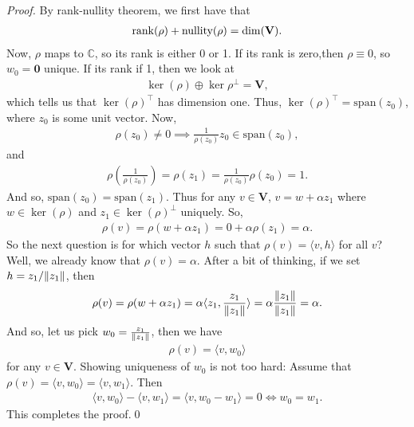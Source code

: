 \documentclass{book}
\theoremstyle{definition}
\newcommand{\C}{\mathbb{C}}
\newcommand{\V}{\mathbf{V}}
\newcommand{\xpan}{\text{span}}
\newcommand{\la}{\langle}
\newcommand{\ra}{\rangle}
\newcommand{\lp}{\left(}
\newcommand{\rp}{\right)}
\begin{document}
\begin{proof}
	By rank-nullity theorem, we first have that
	\begin{align*}
	\rank(\rho) + \text{nullity}(\rho) = \dim(\V).
	\end{align*}
	Now, $\rho$ maps to $\C$, so its rank is either 0 or 1. If its rank is zero,then $\rho \equiv 0$, so $w_0 = \mathbf{0}$ unique. If its rank if 1, then we look at 
	\begin{align*}
	\ker(\rho) \oplus \ker{\rho}^\perp = \V,
	\end{align*}
	which tells us that $\ker(\rho)^\top$ has dimension one. Thus, $\ker(\rho)^\top = \xpan(z_0)$, where $z_0$ is some unit vector. Now, 
	\begin{align*}
	\rho(z_0) \neq 0 \implies \frac{1}{\rho(z_0)}z_0 \in \xpan(z_0),
	\end{align*}
	and
	\begin{align*}
	\rho\lp \frac{1}{\rho(z_0)} \rp = \rho(z_1) = \frac{1}{\rho(z_0)}\rho(z_0) = 1.
	\end{align*}
	And so, $\xpan(z_0) = \xpan(z_1)$. Thus for any $v\in \V$, $v = w + \alpha z_1$ where $w \in \ker(\rho)$ and $z_1 \in \ker(\rho)^\perp$ uniquely. So, 
	\begin{align*}
	\rho(v) = \rho(w + \alpha z_1) = 0 + \alpha\rho(z_1) = \alpha.
	\end{align*}
	So the next question is for which vector $h$ such that $\rho(v) = \la v,h \ra$ for all $v$? Well, we already know that $\rho(v) = \alpha$. After a bit of thinking, if we set $h = z_1 / \norm{z_1}$, then
	\begin{align*}
	\rho(v) = \rho(w + \alpha z_1) = \alpha \la z_1, \frac{z_1}{\norm{z_1}}  \ra = \alpha \frac{\norm{z_1}}{\norm{z_1}} = \alpha.
	\end{align*}
	And so, let us pick $w_0 = \frac{z_1}{\norm{z_1}}$, then we have
	\begin{align*}
	\rho(v) = \la v,w_0 \ra
	\end{align*}
	for any $v\in \V$. Showing uniqueness of $w_0$ is not too hard: Assume that $\rho(v) = \la v,w_0 \ra = \la v,w_1 \ra$. Then 
	\begin{align*}
	\la v,w_0 \ra - \la v,w_1 \ra = \la v, w_0 - w_1\ra = 0 \iff w_0 = w_1.
	\end{align*} 
	This completes the proof.\qed
\end{proof}
\end{document}
